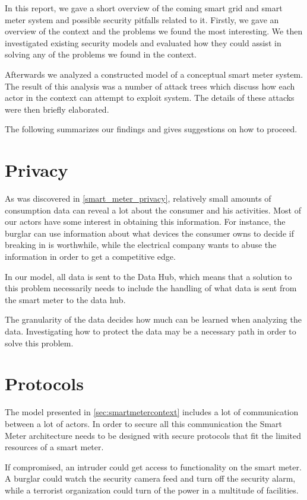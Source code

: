 In this report, we gave a short overview of the coming smart grid and smart meter system and possible security pitfalls related to it.
Firstly, we gave an overview of the context and the problems we found the most interesting.
We then investigated existing security models and evaluated how they could assist in solving any of the problems we found in the context.

Afterwards we analyzed a constructed model of a conceptual smart meter system.
The result of this analysis was a number of attack trees which discuss how each actor in the context can attempt to exploit system.
The details of these attacks were then briefly elaborated.

The following summarizes our findings and gives suggestions on how to proceed.

\section{Privacy}
As was discovered in \cref{smart_meter_privacy}, relatively small amounts of consumption data can reveal a lot about the consumer and his activities.
Most of our actors have some interest in obtaining this information.
For instance, the burglar can use information about what devices the consumer owns to decide if breaking in is worthwhile, while the electrical company wants to abuse the information in order to get a competitive edge.

In our model, all data is sent to the Data Hub, which means that a solution to this problem necessarily needs to include the handling of what data is sent from the smart meter to the data hub.

The granularity of the data decides how much can be learned when analyzing the data.
Investigating how to protect the data may be a necessary path in order to solve this problem.

\section{Protocols}
The model presented in \cref{sec:smartmetercontext} includes a lot of communication between a lot of actors.
In order to secure all this communication the Smart Meter architecture needs to be designed with secure protocols that fit the limited resources of a smart meter.

If compromised, an intruder could get access to functionality on the smart meter.
A burglar could watch the security camera feed and turn off the security alarm, while a terrorist organization could turn of the power in a multitude of facilities.

